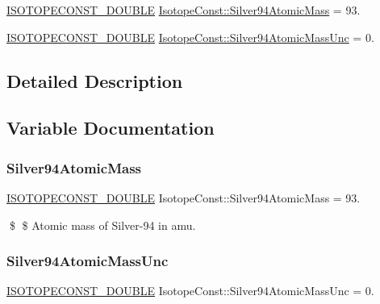 \begin{DoxyCompactItemize}
\item 
\mbox{\hyperlink{group___isotope_const-_macros_ga8f45a7272ce02c0b4c65c44636ed719a}{I\+S\+O\+T\+O\+P\+E\+C\+O\+N\+S\+T\+\_\+\+D\+O\+U\+B\+LE}} \mbox{\hyperlink{group___isotope_const-_silver-_ag94_ga8f0423bdf0d47fad79d0abe611b3b421}{Isotope\+Const\+::\+Silver94\+Atomic\+Mass}} = 93.
\item 
\mbox{\hyperlink{group___isotope_const-_macros_ga8f45a7272ce02c0b4c65c44636ed719a}{I\+S\+O\+T\+O\+P\+E\+C\+O\+N\+S\+T\+\_\+\+D\+O\+U\+B\+LE}} \mbox{\hyperlink{group___isotope_const-_silver-_ag94_ga79bb7a05f62fc3fd528fe29a5eed1b57}{Isotope\+Const\+::\+Silver94\+Atomic\+Mass\+Unc}} = 0.
\end{DoxyCompactItemize}


\subsection{Detailed Description}


\subsection{Variable Documentation}
\mbox{\label{group___isotope_const-_silver-_ag94_ga8f0423bdf0d47fad79d0abe611b3b421}} 
\subsubsection{\texorpdfstring{Silver94\+Atomic\+Mass}{Silver94AtomicMass}}
{\footnotesize\ttfamily \mbox{\hyperlink{group___isotope_const-_macros_ga8f45a7272ce02c0b4c65c44636ed719a}{I\+S\+O\+T\+O\+P\+E\+C\+O\+N\+S\+T\+\_\+\+D\+O\+U\+B\+LE}} Isotope\+Const\+::\+Silver94\+Atomic\+Mass = 93.}

\$ \$ Atomic mass of Silver-\/94 in amu. \mbox{\label{group___isotope_const-_silver-_ag94_ga79bb7a05f62fc3fd528fe29a5eed1b57}} 
\subsubsection{\texorpdfstring{Silver94\+Atomic\+Mass\+Unc}{Silver94AtomicMassUnc}}
{\footnotesize\ttfamily \mbox{\hyperlink{group___isotope_const-_macros_ga8f45a7272ce02c0b4c65c44636ed719a}{I\+S\+O\+T\+O\+P\+E\+C\+O\+N\+S\+T\+\_\+\+D\+O\+U\+B\+LE}} Isotope\+Const\+::\+Silver94\+Atomic\+Mass\+Unc = 0.}

